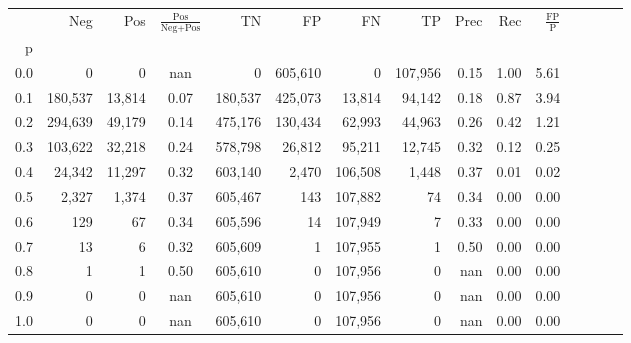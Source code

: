 \begin{tabular}{rrrcrrrrrrrrrrr}
\toprule
{} &      Neg &     Pos & $\frac{\text{Pos}}{\text{Neg}+\text{Pos}}$ &       TN &       FP &       FN &       TP &  Prec &   Rec & $\frac{\text{FP}}{\text{P}}$ \\
p   &          &         &                                            &          &          &          &          &       &       &                              \\
\midrule
0.0 &        0 &       0 &                                        nan &        0 &  605,610 &        0 &  107,956 &  0.15 &  1.00 &                         5.61 \\
0.1 &  180,537 &  13,814 &                                       0.07 &  180,537 &  425,073 &   13,814 &   94,142 &  0.18 &  0.87 &                         3.94 \\
0.2 &  294,639 &  49,179 &                                       0.14 &  475,176 &  130,434 &   62,993 &   44,963 &  0.26 &  0.42 &                         1.21 \\
0.3 &  103,622 &  32,218 &                                       0.24 &  578,798 &   26,812 &   95,211 &   12,745 &  0.32 &  0.12 &                         0.25 \\
0.4 &   24,342 &  11,297 &                                       0.32 &  603,140 &    2,470 &  106,508 &    1,448 &  0.37 &  0.01 &                         0.02 \\
0.5 &    2,327 &   1,374 &                                       0.37 &  605,467 &      143 &  107,882 &       74 &  0.34 &  0.00 &                         0.00 \\
0.6 &      129 &      67 &                                       0.34 &  605,596 &       14 &  107,949 &        7 &  0.33 &  0.00 &                         0.00 \\
0.7 &       13 &       6 &                                       0.32 &  605,609 &        1 &  107,955 &        1 &  0.50 &  0.00 &                         0.00 \\
0.8 &        1 &       1 &                                       0.50 &  605,610 &        0 &  107,956 &        0 &   nan &  0.00 &                         0.00 \\
0.9 &        0 &       0 &                                        nan &  605,610 &        0 &  107,956 &        0 &   nan &  0.00 &                         0.00 \\
1.0 &        0 &       0 &                                        nan &  605,610 &        0 &  107,956 &        0 &   nan &  0.00 &                         0.00 \\
\bottomrule
\end{tabular}
